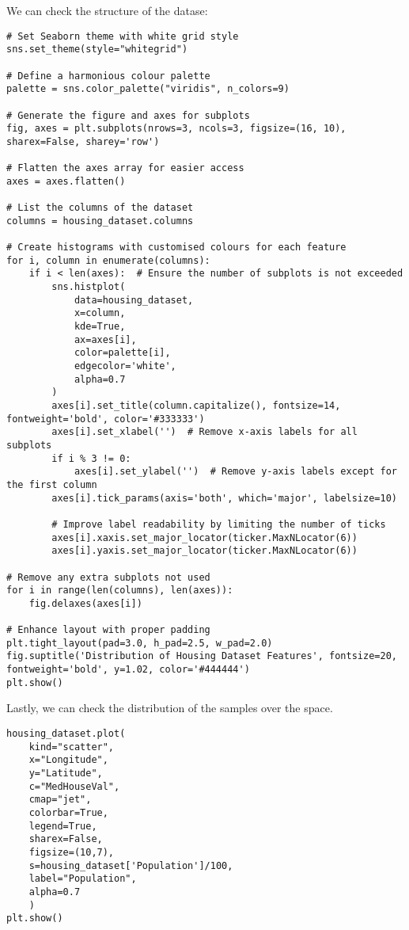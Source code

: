 We can check the structure of the datase:
\begin{lstlisting}[style=Python]
# Set Seaborn theme with white grid style
sns.set_theme(style="whitegrid")

# Define a harmonious colour palette
palette = sns.color_palette("viridis", n_colors=9)

# Generate the figure and axes for subplots
fig, axes = plt.subplots(nrows=3, ncols=3, figsize=(16, 10), sharex=False, sharey='row')

# Flatten the axes array for easier access
axes = axes.flatten()

# List the columns of the dataset
columns = housing_dataset.columns

# Create histograms with customised colours for each feature
for i, column in enumerate(columns):
    if i < len(axes):  # Ensure the number of subplots is not exceeded
        sns.histplot(
            data=housing_dataset,
            x=column,
            kde=True,
            ax=axes[i],
            color=palette[i],
            edgecolor='white',
            alpha=0.7
        )
        axes[i].set_title(column.capitalize(), fontsize=14, fontweight='bold', color='#333333')
        axes[i].set_xlabel('')  # Remove x-axis labels for all subplots
        if i % 3 != 0:
            axes[i].set_ylabel('')  # Remove y-axis labels except for the first column
        axes[i].tick_params(axis='both', which='major', labelsize=10)

        # Improve label readability by limiting the number of ticks
        axes[i].xaxis.set_major_locator(ticker.MaxNLocator(6))
        axes[i].yaxis.set_major_locator(ticker.MaxNLocator(6))

# Remove any extra subplots not used
for i in range(len(columns), len(axes)):
    fig.delaxes(axes[i])

# Enhance layout with proper padding
plt.tight_layout(pad=3.0, h_pad=2.5, w_pad=2.0)
fig.suptitle('Distribution of Housing Dataset Features', fontsize=20, fontweight='bold', y=1.02, color='#444444')
plt.show()
\end{lstlisting}
Lastly, we can check the distribution of the samples over the space. 
\begin{lstlisting}[style=Python]
housing_dataset.plot(
    kind="scatter",
    x="Longitude",
    y="Latitude",
    c="MedHouseVal",
    cmap="jet",
    colorbar=True,
    legend=True,
    sharex=False,
    figsize=(10,7),
    s=housing_dataset['Population']/100,
    label="Population",
    alpha=0.7
    )
plt.show()
\end{lstlisting}